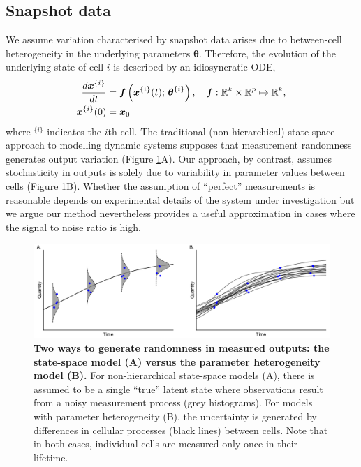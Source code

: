 \subsection{Snapshot data}
We assume variation characterised by snapshot data arises due to between-cell heterogeneity in the underlying parameters $\boldsymbol{\theta}$. Therefore, the evolution of the underlying state of cell $i$ is described by an idiosyncratic ODE,
%
\begin{equation} \label{eq:ode_i}
\begin{aligned}
\frac{d\boldsymbol{x}^{\{i\}}}{dt} &= \boldsymbol{f} \left( \boldsymbol{x}^{\{i\}}(t); \, \boldsymbol{\theta}^{\{i\}} \right),
                                      \quad \boldsymbol{f}: \mathbb{R}^k \times \mathbb{R}^p \mapsto \mathbb{R}^k, \\
\boldsymbol{x}^{\{i\}}(0) &= \boldsymbol{x}_0
\end{aligned}
\end{equation}
where $^{\{i\}}$ indicates the $i$th cell.
%
The traditional (non-hierarchical) state-space approach to modelling dynamic systems supposes that measurement randomness generates output variation (Figure \ref{fig:data_generation}A). Our approach, by contrast, assumes stochasticity in outputs is solely due to variability in parameter values between cells (Figure \ref{fig:data_generation}B). Whether the assumption of ``perfect'' measurements is reasonable depends on experimental details of the system under investigation but we argue our method nevertheless provides a useful approximation in cases where the signal to noise ratio is high.

\begin{figure}[H]
	\centerline{\includegraphics[width=\textwidth]{../figures/data_generation.pdf}}
	\caption{\textbf{Two ways to generate randomness in measured outputs: the state-space model (A) versus the parameter heterogeneity model (B).} For non-hierarchical state-space models (A), there is assumed to be a single ``true'' latent state where observations result from a noisy measurement process (grey histograms). For models with parameter heterogeneity (B), the uncertainty is generated by differences in cellular processes (black lines) between cells. Note that in both cases, individual cells are measured only once in their lifetime.}
	\label{fig:data_generation}
\end{figure}

